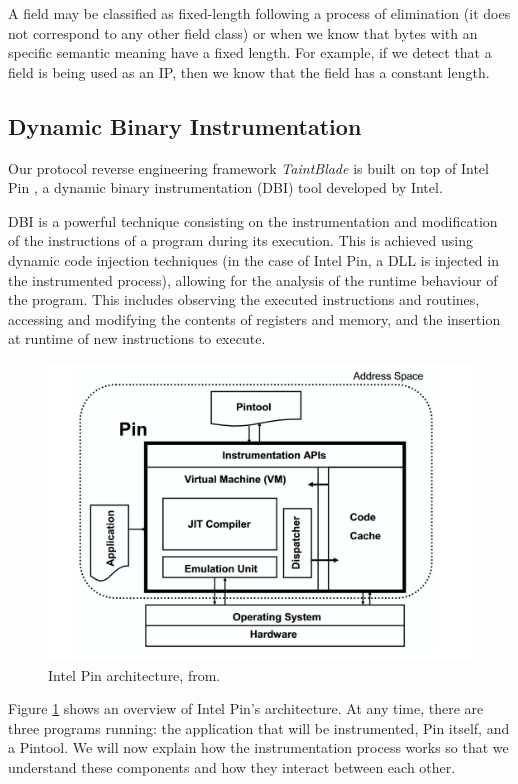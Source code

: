 \documentclass[conference]{IEEEtran}
\begin{document}
A field may be classified as fixed-length following a process of elimination
(it does not correspond to any other field class) or when we know that bytes
with an specific semantic meaning have a fixed length. For example, if we
detect that a field is being used as an IP, then we know that the field has a
constant length.

\subsection {Dynamic Binary Instrumentation}
Our protocol reverse engineering framework \textit{TaintBlade} is built on top
of Intel Pin \cite{intelpin_main}, a dynamic binary instrumentation (DBI) tool
developed by Intel.

DBI is a powerful technique consisting on the instrumentation and modification
of the instructions of a program during its execution. This is achieved using
dynamic code injection techniques (in the case of Intel Pin, a DLL is injected
in the instrumented process), allowing for the analysis of the runtime
behaviour of the program. This includes observing the executed instructions and
routines, accessing and modifying the contents of registers and memory, and the
insertion at runtime of new instructions to execute.

\begin{figure}[htbp]
    \centerline{\includegraphics[width=1.0\columnwidth]{images/intelpin_arch.png}}
    \caption{Intel Pin architecture, from\cite{intelpin_lukpaper}.}
    \label{figure:intelpin_arch}
\end{figure}

Figure \ref{figure:intelpin_arch} shows an overview of Intel Pin's
architecture. At any time, there are three programs running: the application
that will be instrumented, Pin itself, and a Pintool. We will now explain how
the instrumentation process works so that we understand these components and
how they interact between each other.
\end{document}
